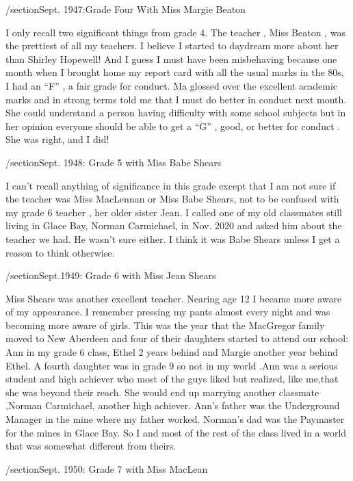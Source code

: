 /section{Sept. 1947:Grade Four With Miss Margie Beaton}

I only recall two significant things from grade 4. The teacher , Miss Beaton , was the prettiest of all my teachers. I believe I started to daydream more about her than Shirley Hopewell! And I guess I must have been misbehaving because one month when I brought home my report card with all the usual marks in the 80s, I had an “F” , a fair grade for conduct. Ma glossed over the excellent academic marks and in strong terms told me that I must do better in conduct next month. She could understand a person having difficulty with some school subjects but in her opinion everyone should be able to get a “G” , good, or better for conduct . She was right, and I did!

/section{Sept. 1948: Grade 5 with Miss Babe Shears}

I can't recall anything of significance in this grade except that I am not sure if the teacher was Miss MacLennan or Miss Babe Shears, not to be confused with my grade 6 teacher , her older sister Jean. I called one of my old classmates still living in Glace Bay, Norman Carmichael, in Nov. 2020 and asked him about the teacher we had. He wasn't sure either. I think it was Babe Shears unless I get a reason to think otherwise.

/section{Sept.1949: Grade 6 with Miss Jean Shears}

Miss Shears was another excellent teacher. Nearing age 12 I became more aware of my appearance. I remember pressing my pants almost every night and was becoming more aware of girls. This was the year that the MacGregor family moved to New Aberdeen and four of their daughters started to attend our school: Ann in my grade 6 class, Ethel 2 years behind and Margie another year behind Ethel. A fourth daughter was in grade 9 so not in my world .Ann was a serious student and high achiever who most of the guys liked but realized, like me,that she was beyond their reach. She would end up marrying another classmate ,Norman Carmichael, another high achiever. Ann's father was the Underground Manager in the mine where my father worked. Norman's dad was the Paymaster for the mines in Glace Bay. So I and most of the rest of the class lived in a world that was somewhat different from theirs. 

/section{Sept. 1950: Grade 7 with Miss MacLean}

